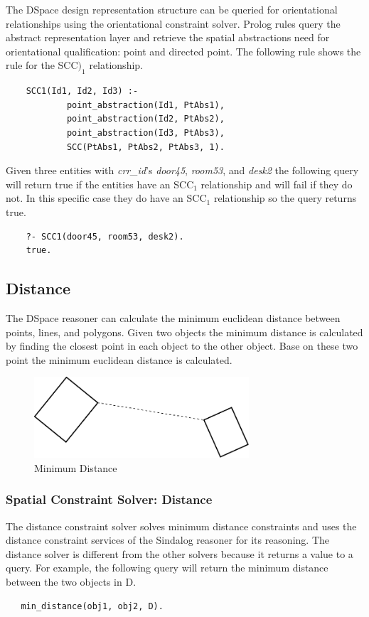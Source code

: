 \documentclass[12pt]{ucthesis}
\begin{document}
The DSpace design representation structure can be queried for orientational relationships using the orientational constraint solver. Prolog rules query the abstract representation layer and retrieve the spatial abstractions need for orientational qualification: point and directed point. The following rule shows the rule for the SCC$)_{1}$ relationship.
\begin{verbatim}
    SCC1(Id1, Id2, Id3) :-
            point_abstraction(Id1, PtAbs1),
            point_abstraction(Id2, PtAbs2),
            point_abstraction(Id3, PtAbs3),
            SCC(PtAbs1, PtAbs2, PtAbs3, 1).
\end{verbatim}
Given three entities with \emph{crr\_id}’s \emph{door45}, \emph{room53}, and \emph{desk2} the following query will return true if the entities have an SCC$_{1}$ relationship and will fail if they do not. In this specific case they do have an SCC$_{1}$ relationship so the query returns true.
\begin{verbatim}
    ?- SCC1(door45, room53, desk2).
    true.
\end{verbatim}


\subsection{Distance}
The DSpace reasoner can calculate the minimum euclidean distance between points, lines, and polygons. Given two objects the minimum distance is calculated by finding the closest point in each object to the other object. Base on these two point the minimum euclidean distance is calculated. 

\begin{figure}[H]
\centering
\includegraphics[width=80mm]{min-dist}
\caption{Minimum Distance}
\label{min-dist}
\end{figure}

\subsubsection{Spatial Constraint Solver: Distance}
The distance constraint solver solves minimum distance constraints and uses the distance constraint services of the Sindalog \cite{sindalog} reasoner for its reasoning. The distance solver is different from the other solvers because it returns a value to a query. For example, the following query will return the minimum distance between the two objects in D.
\begin{verbatim}
   min_distance(obj1, obj2, D). 
\end{verbatim}
\end{document}
